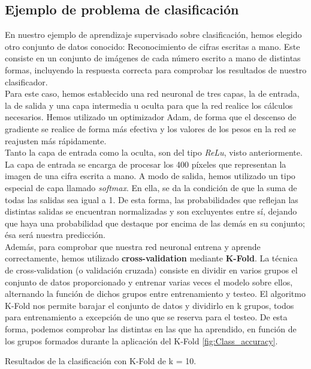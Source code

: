 \subsection{Ejemplo de problema de clasificación}
En nuestro ejemplo de aprendizaje supervisado sobre clasificación, hemos elegido otro conjunto de datos conocido: Reconocimiento de cifras escritas a mano. Este consiste en un conjunto de imágenes de cada número escrito a mano de distintas formas, incluyendo la respuesta correcta para comprobar los resultados de nuestro clasificador. \\

Para este caso, hemos establecido una red neuronal de tres capas, la de entrada, la de salida y una capa intermedia u oculta para que la red realice los cálculos necesarios. Hemos utilizado un optimizador Adam, de forma que el descenso de gradiente se realice de forma más efectiva y los valores de los pesos en la red se reajusten más rápidamente. \\

Tanto la capa de entrada como la oculta, son del tipo \textit{ReLu}, visto anteriormente. La capa de entrada se encarga de procesar los 400 píxeles que representan la imagen de una cifra escrita a mano. A modo de salida, hemos utilizado un tipo especial de capa llamado \textit{softmax}. En ella, se da la condición de que la suma de todas las salidas sea igual a 1. De esta forma, las probabilidades que reflejan las distintas salidas se encuentran normalizadas y son excluyentes entre sí, dejando que haya una probabilidad que destaque por encima de las demás en su conjunto; ésa será nuestra predicción. \\

Además, para comprobar que nuestra red neuronal entrena y aprende correctamente, hemos utilizado \textbf{cross-validation} mediante \textbf{K-Fold}. La técnica de cross-validation (o validación cruzada) consiste en dividir en varios grupos el conjunto de datos proporcionado y entrenar varias veces el modelo sobre ellos, alternando la función de dichos grupos entre entrenamiento y testeo. El algoritmo K-Fold nos permite barajar el conjunto de datos y dividirlo en k grupos, todos para entrenamiento a excepción de uno que se reserva para el testeo. De esta forma, podemos comprobar las distintas en las que ha aprendido, en función de los grupos formados durante la aplicación del K-Fold \ref{fig:Class_accuracy}.

%
        {Resultados de la clasificación con K-Fold de k = 10.}



